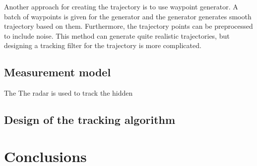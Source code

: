 \documentclass[11pt,a4paper]{article}
\begin{document}
Another approach for creating the trajectory is to use waypoint generator.
A batch of waypoints is given for the generator and the generator generates smooth trajectory based on them.
Furthermore, the trajectory points can be preprocessed to include noise.
This method can generate quite realistic trajectories, but designing a tracking filter for the trajectory is more complicated.

\subsection{Measurement model}

The 
The radar is used to track the hidden 

\subsection{Design of the tracking algorithm}

\newpage
\section{Conclusions}



\newpage


\end{document}
